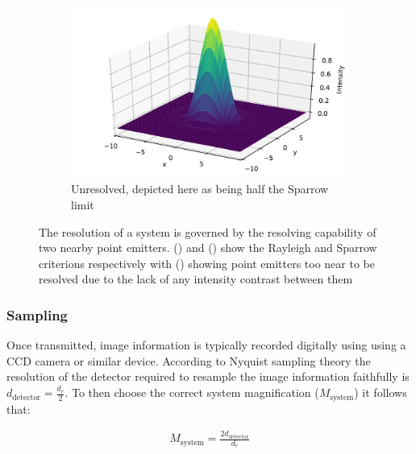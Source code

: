     \begin{figure}
    \ContinuedFloat
    \begin{subfigure}[b]{\textwidth}
        \includegraphics{+airy_too_close}
        \caption{Unresolved, depicted here as being half the Sparrow limit}
        \label{fig:airy_too_close}
    \end{subfigure}
    \caption{The resolution of a system is governed by the resolving capability of two nearby point emitters.
    () and () show the Rayleigh and Sparrow criterions respectively with () showing point emitters too near to be resolved due to the lack of any intensity contrast between them}
    \label{fig:airy_disk_resolution}
\end{figure}

%

\subsubsection{Sampling}

Once transmitted, image information is typically recorded digitally using using a CCD camera or similar device.
According to Nyquist sampling theory the resolution of the detector required to resample the image information faithfully is $d_\text{detector} = \frac{d_r}{2}$.
To then choose the correct system magnification ($M_\text{system}$) it follows that:

\begin{align}
    M_\text{system} = \frac{2d_\text{detector}}{d_r}
\end{align}

